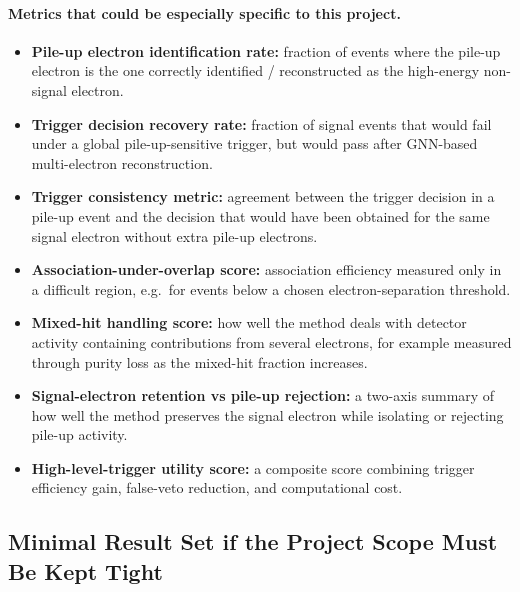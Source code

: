 \paragraph{Metrics that could be especially specific to this project.}
\begin{itemize}
    \item \textbf{Pile-up electron identification rate:}
    fraction of events where the pile-up electron is the one correctly identified / reconstructed as the high-energy non-signal electron.
    
    \item \textbf{Trigger decision recovery rate:}
    fraction of signal events that would fail under a global pile-up-sensitive trigger, but would pass after GNN-based multi-electron reconstruction.
    
    \item \textbf{Trigger consistency metric:}
    agreement between the trigger decision in a pile-up event and the decision that would have been obtained for the same signal electron without extra pile-up electrons.
    
    \item \textbf{Association-under-overlap score:}
    association efficiency measured only in a difficult region, e.g.\ for events below a chosen electron-separation threshold.
    
    \item \textbf{Mixed-hit handling score:}
    how well the method deals with detector activity containing contributions from several electrons, for example measured through purity loss as the mixed-hit fraction increases.
    
    \item \textbf{Signal-electron retention vs pile-up rejection:}
    a two-axis summary of how well the method preserves the signal electron while isolating or rejecting pile-up activity.
    
    \item \textbf{High-level-trigger utility score:}
    a composite score combining trigger efficiency gain, false-veto reduction, and computational cost.
\end{itemize}

\subsection{Minimal Result Set if the Project Scope Must Be Kept Tight}

